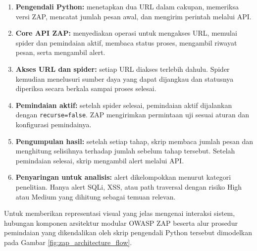 \begin{enumerate}
\begin{enumerate}
    \item \textbf{Pengendali Python:} menetapkan dua URL dalam cakupan, memeriksa versi ZAP, mencatat jumlah pesan awal, dan mengirim perintah melalui API.
    \item \textbf{Core API ZAP:} menyediakan operasi untuk mengakses URL, memulai spider dan pemindaian aktif, membaca status proses, mengambil riwayat pesan, serta mengambil alert.
    \item \textbf{Akses URL dan spider:} setiap URL diakses terlebih dahulu. Spider kemudian menelusuri sumber daya yang dapat dijangkau dan statusnya diperiksa secara berkala sampai proses selesai.
    \item \textbf{Pemindaian aktif:} setelah spider selesai, pemindaian aktif dijalankan dengan \texttt{recurse=false}. ZAP mengirimkan permintaan uji sesuai aturan dan konfigurasi pemindainya.
    \item \textbf{Pengumpulan hasil:} setelah setiap tahap, skrip membaca jumlah pesan dan menghitung selisihnya terhadap jumlah sebelum tahap tersebut. Setelah pemindaian selesai, skrip mengambil alert melalui API.
    \item \textbf{Penyaringan untuk analisis:} alert dikelompokkan menurut kategori penelitian. Hanya alert SQLi, XSS, atau path traversal dengan risiko High atau Medium yang dihitung sebagai temuan relevan.
\end{enumerate}

Untuk memberikan representasi visual yang jelas mengenai interaksi sistem, hubungan komponen arsitektur modular OWASP ZAP beserta alur prosedur pemindaian yang dikendalikan oleh skrip pengendali Python tersebut dimodelkan pada Gambar \ref{fig:zap_architecture_flow}.

\begin{figure}[H]
\centering
\resizebox{\textwidth}{!}{
\begin{tikzpicture}[
    font=\sffamily\small,
    node distance=1.2cm and 1.5cm,
    core/.style={rectangle, rounded corners, draw=blue!70, fill=blue!10, thick, minimum width=3.3cm, minimum height=1.1cm, align=center},
    scanner/.style={rectangle, rounded corners, draw=orange!70, fill=orange!10, thick, minimum width=3.3cm, minimum height=1.1cm, align=center},
    db/.style={cylinder, draw=gray!70, fill=gray!20, thick, shape border rotate=90, minimum width=2.2cm, minimum height=1.6cm, align=center},
    external/.style={rectangle, draw=green!70!black, fill=green!5, thick, minimum width=3.3cm, minimum height=1.1cm, align=center},
    arrow/.style={- {Stealth[scale=1.2]}, thick, draw=gray!80},
    doublearrow/.style={{Stealth[scale=1.2]} - {Stealth[scale=1.2]}, thick, draw=gray!80}
]


\end{tikzpicture}}
\end{figure}
\end{enumerate}
